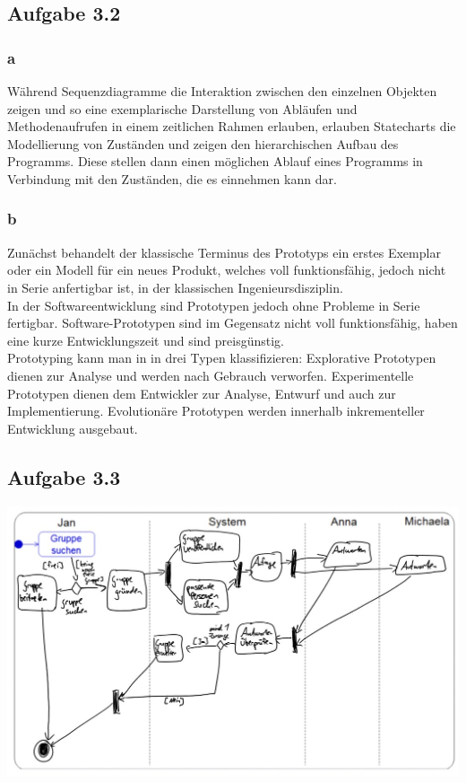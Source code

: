 \documentclass[a4paper,graphics,11pt]{article}
\newcommand\aufgabe[1]{\subsection*{Aufgabe #1}}
\newcommand\aufgabenteil[1]{\subsubsection*{#1}}
\begin{document}
\aufgabe{3.2}
\aufgabenteil{a}
W{\"a}hrend Sequenzdiagramme die Interaktion zwischen den einzelnen Objekten zeigen und so eine exemplarische Darstellung von Abl{\"a}ufen und Methodenaufrufen in einem zeitlichen Rahmen erlauben, erlauben Statecharts die Modellierung von Zust{\"a}nden und zeigen den hierarchischen Aufbau des Programms. Diese stellen dann einen m{\"o}glichen Ablauf eines Programms in Verbindung mit den Zust{\"a}nden, die es einnehmen kann dar.
\aufgabenteil{b}
Zun{\"a}chst behandelt der klassische Terminus des Prototyps ein erstes Exemplar oder ein Modell f{\"u}r ein neues Produkt, welches voll funktionsf{\"a}hig, jedoch nicht in Serie anfertigbar ist, in der klassischen Ingenieursdisziplin.\\
In der Softwareentwicklung sind Prototypen jedoch ohne Probleme in Serie fertigbar. Software-Prototypen sind im Gegensatz nicht voll funktionsf{\"a}hig, haben eine kurze Entwicklungszeit und sind preisg{\"u}nstig.\\
Prototyping kann man in in drei Typen klassifizieren: Explorative Prototypen dienen zur Analyse und werden nach Gebrauch verworfen. Experimentelle Prototypen dienen dem Entwickler zur Analyse, Entwurf und auch zur Implementierung. Evolution{\"a}re Prototypen werden innerhalb inkrementeller Entwicklung ausgebaut.
\aufgabe{3.3}
\begin{center}
\includegraphics[scale=0.35]{33.jpeg}
\end{center}
\end{document}
